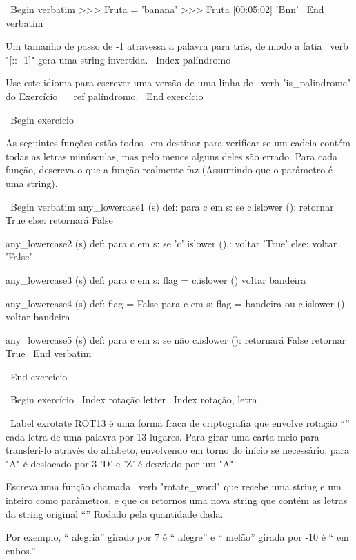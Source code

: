 \documentclass[10pt]{book}
\begin{document}
\begin {itemize}
{{{{{{\ Begin {verbatim}
>>> Fruta = 'banana'
>>> Fruta [00:05:02]
'Bnn'
\ End {verbatim}

Um tamanho de passo de -1 atravessa a palavra para trás, de modo
a fatia \ verb "[:: -1]" gera uma string invertida.
\ Index {palíndromo}

Use este idioma para escrever uma versão de uma linha de \ verb "is_palindrome"
do Exercício ~ \ ref {} palíndromo.
\ End {} exercício


\ Begin {} exercício

As seguintes funções estão todos {\ em destinar} para verificar se um
cadeia contém todas as letras minúsculas, mas pelo menos alguns deles são
errado. Para cada função, descreva o que a função realmente faz
(Assumindo que o parâmetro é uma string).

\ Begin {verbatim}
any_lowercase1 (s) def:
    para c em s:
        se c.islower ():
            retornar True
        else:
            retornará False

any_lowercase2 (s) def:
    para c em s:
        se 'c' islower ().:
            voltar 'True'
        else:
            voltar 'False'

any_lowercase3 (s) def:
    para c em s:
        flag = c.islower ()
    voltar bandeira

any_lowercase4 (s) def:
    flag = False
    para c em s:
        flag = bandeira ou c.islower ()
    voltar bandeira

any_lowercase5 (s) def:
    para c em s:
        se não c.islower ():
            retornará False
    retornar True
\ End {verbatim}

\ End {} exercício


\ Begin {} exercício
\ Index {rotação letter}
\ Index {rotação, letra}

\ Label {} exrotate
ROT13 é uma forma fraca de criptografia que envolve rotação ``'' cada
letra de uma palavra por 13 lugares. Para girar uma carta meio
para transferi-lo através do alfabeto, envolvendo em torno do início se
necessário, para "A" é deslocado por 3 'D' e 'Z' é desviado por um "A".

Escreva uma função chamada \ verb "rotate_word"
que recebe uma string e um inteiro como parâmetros, e que os retornos
uma nova string que contém as letras da string original
``'' Rodado pela quantidade dada.  

Por exemplo, `` alegria'' girado por 7 é `` alegre'' e `` melão'' girada
por -10 é `` em cubos.''  


}}}}}}
\end{itemize}
\end{document}
